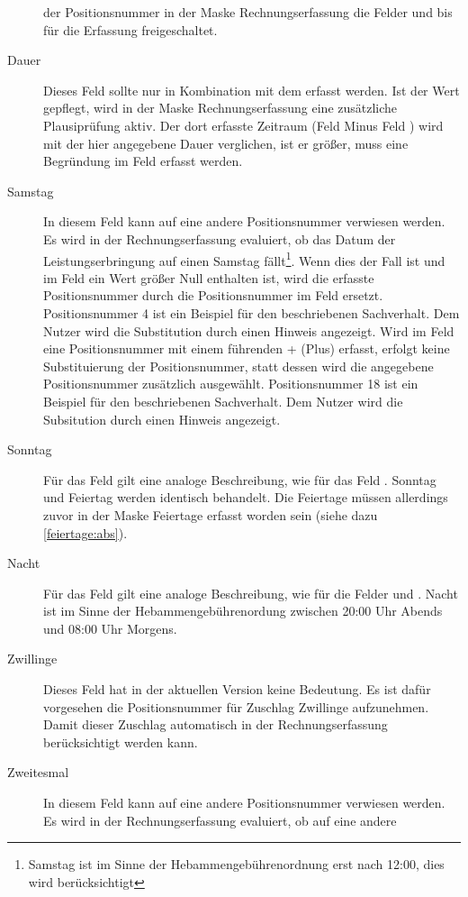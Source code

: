 \begin{description}
der Positionsnummer in der Maske Rechnungserfassung die Felder
 und  bis für die Erfassung freigeschaltet.
\item[Dauer] 
Dieses Feld sollte nur in Kombination mit dem 
erfasst werden. Ist der Wert gepflegt, wird in der Maske Rechnungserfassung
eine zusätzliche Plausiprüfung aktiv. Der dort erfasste Zeitraum
(Feld  Minus Feld ) wird mit der hier 
angegebene Dauer verglichen, ist er größer, muss
eine Begründung im Feld  erfasst werden.
\item[Samstag] 
In diesem Feld kann auf eine andere Positionsnummer verwiesen
werden. Es wird in der Rechnungserfassung evaluiert, ob das Datum
der Leistungserbringung auf einen Samstag fällt\footnote{Samstag ist im
Sinne der Hebammengebührenordnung erst nach 12:00, dies wird berücksichtigt}.
Wenn dies der Fall ist und im Feld
 ein Wert größer Null enthalten ist, 
wird die erfasste Positionsnummer
durch die Positionsnummer im Feld  ersetzt. Positionsnummer 4
ist ein Beispiel für den beschriebenen Sachverhalt. 
Dem Nutzer wird die Substitution durch einen Hinweis angezeigt. 
Wird im Feld
 eine Positionsnummer mit einem führenden + (Plus) erfasst,
erfolgt keine Substituierung der Positionsnummer, statt dessen wird die
angegebene Positionsnummer zusätzlich ausgewählt. Positionsnummer 18 ist
ein Beispiel für den beschriebenen Sachverhalt. Dem Nutzer wird die
Subsitution durch einen Hinweis angezeigt.
\item[Sonntag] 
Für das Feld  gilt eine analoge Beschreibung,
wie für das Feld . Sonntag und Feiertag werden identisch
behandelt. Die Feiertage müssen allerdings zuvor in der Maske Feiertage
erfasst worden sein (siehe dazu \vref{feiertage:abs}).
\item[Nacht] 
Für das Feld  gilt eine analoge Beschreibung,
wie für die Felder  und . Nacht ist im Sinne
der Hebammengebührenordung zwischen 20:00 Uhr Abends und 08:00 Uhr Morgens.
\item[Zwillinge] 
Dieses Feld hat in der aktuellen Version keine Bedeutung. Es
ist dafür vorgesehen die Positionsnummer für  Zuschlag Zwillinge aufzunehmen.
Damit dieser Zuschlag automatisch in der Rechnungserfassung berücksichtigt
werden kann.
\item[Zweitesmal]
In diesem Feld kann auf eine andere Positionsnummer verwiesen
werden. Es wird in der Rechnungserfassung evaluiert, ob auf eine andere

\end{description}
